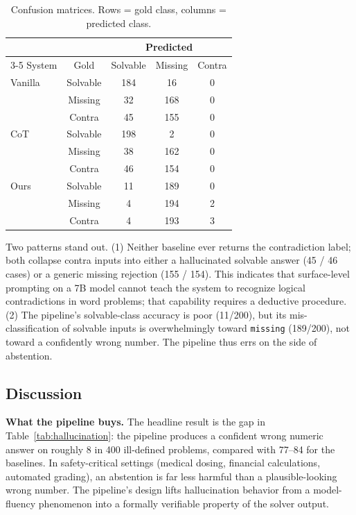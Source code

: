 \documentclass[sigconf, nonacm, onecolumn]{acmart}
\begin{document}
\begin{table}[t]
  \centering
  \small
  \caption{Confusion matrices. Rows = gold class, columns = predicted
  class.}
  \label{tab:confusion}
  \begin{tabular}{l c c c c}
    \toprule
    & & \multicolumn{3}{c}{Predicted} \\
    \cmidrule(lr){3-5}
    System & Gold & Solvable & Missing & Contra \\
    \midrule
    Vanilla     & Solvable & 184 & 16  & 0 \\
                & Missing  & 32  & 168 & 0 \\
                & Contra   & 45  & 155 & 0 \\
    \midrule
    CoT         & Solvable & 198 & 2   & 0 \\
                & Missing  & 38  & 162 & 0 \\
                & Contra   & 46  & 154 & 0 \\
    \midrule
    Ours        & Solvable & 11  & 189 & 0 \\
                & Missing  & 4   & 194 & 2 \\
                & Contra   & 4   & 193 & 3 \\
    \bottomrule
  \end{tabular}
\end{table}
\normalsize

Two patterns stand out. (1) Neither baseline ever returns the
contradiction label; both collapse contra inputs into either a
hallucinated solvable answer (45 / 46 cases) or a generic missing
rejection (155 / 154). This indicates that surface-level prompting on a
7B model cannot teach the system to recognize logical contradictions in
word problems; that capability requires a deductive procedure. (2) The
pipeline's solvable-class accuracy is poor (11/200), but its
mis-classification of solvable inputs is overwhelmingly toward
\texttt{missing} (189/200), not toward a confidently wrong number. The
pipeline thus errs on the side of abstention.

\subsection{Discussion}

\textbf{What the pipeline buys.} The headline result is the gap in
Table~\ref{tab:hallucination}: the pipeline produces a confident wrong
numeric answer on roughly 8 in 400 ill-defined problems, compared with
77--84 for the baselines. In safety-critical settings (medical dosing,
financial calculations, automated grading), an abstention is far less
harmful than a plausible-looking wrong number. The pipeline's design
lifts hallucination behavior from a model-fluency phenomenon into a
formally verifiable property of the solver output.
\end{document}

